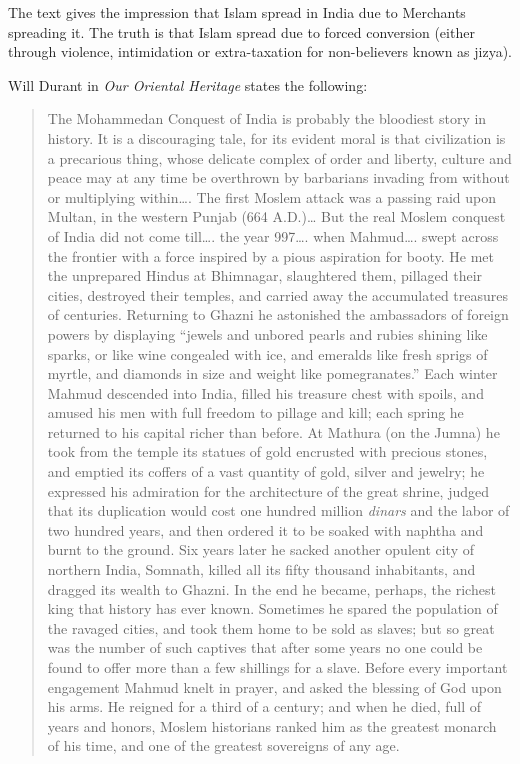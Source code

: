The text gives the impression that Islam spread in India due to Merchants spreading it. The truth is that Islam spread due to forced conversion (either through violence, intimidation or extra-taxation for non-believers known as jizya). 

Will Durant in \textit{Our Oriental Heritage} states the following:
\begin{quote}
The Mohammedan Conquest of India is probably the bloodiest story in history. It is a discouraging tale, for its evident moral is that civilization is a precarious thing, whose delicate complex of order and liberty, culture and peace may at any time be overthrown by barbarians invading from without or multiplying within…. The first Moslem attack was a passing raid upon Multan, in the western Punjab (664 A.D.)… But the real Moslem conquest of India did not come till…. the year 997…. when Mahmud…. swept across the frontier with a force inspired by a pious aspiration for booty. He met the unprepared Hindus at Bhimnagar, slaughtered them, pillaged their cities, destroyed their temples, and carried away the accumulated treasures of centuries. Returning to Ghazni he astonished the ambassadors of foreign powers by displaying “jewels and unbored pearls and rubies shining like sparks, or like wine congealed with ice, and emeralds like fresh sprigs of myrtle, and diamonds in size and weight like pomegranates.” Each winter Mahmud descended into India, filled his treasure chest with spoils, and amused his men with full freedom to pillage and kill; each spring he returned to his capital richer than before. At Mathura (on the Jumna) he took from the temple its statues of gold encrusted with precious stones, and emptied its coffers of a vast quantity of gold, silver and jewelry; he expressed his admiration for the architecture of the great shrine, judged that its duplication would cost one hundred million \textit{dinars} and the labor of two hundred years, and then ordered it to be soaked with naphtha and burnt to the ground. Six years later he sacked another opulent city of northern India, Somnath, killed all its fifty thousand inhabitants, and dragged its wealth to Ghazni. In the end he became, perhaps, the richest king that history has ever known. Sometimes he spared the population of the ravaged cities, and took them home to be sold as slaves; but so great was the number of such captives that after some years no one could be found to offer more than a few shillings for a slave. Before every important engagement Mahmud knelt in prayer, and asked the blessing of God upon his arms. He reigned for a third of a century; and when he died, full of years and honors, Moslem historians ranked him as the greatest monarch of his time, and one of the greatest sovereigns of any age.


\end{quote}
